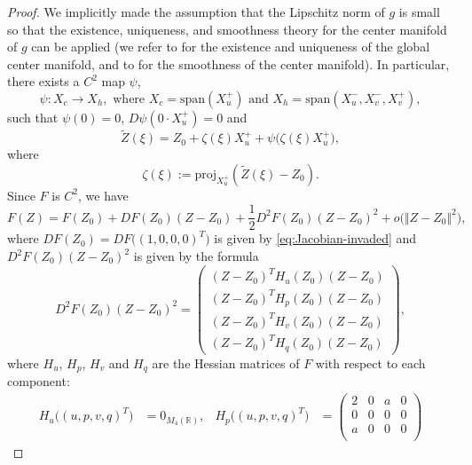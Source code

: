 \documentclass[11pt,a4paper]{article}
\numberwithin{equation}{section}
\numberwithin{figure}{section}
\begin{document}
\begin{proof}
    We implicitly made the assumption that the Lipschitz norm of $g$ is small so that the existence,  uniqueness, and smoothness theory for the center manifold of $g$ can be applied (we refer to \cite[Theorem 2.1]{Van-89} for the existence and uniqueness of the global center manifold, and to \cite[Theorem 3.1]{Van-89} for the smoothness of the center manifold). In particular, there exists a $C^2$ map $\psi$, 
    \begin{equation*}
        \psi:X_c\to X_h, \text{ where }  X_c = \text{span}(X_{u}^{+}) \text{ and }X_h = \text{span}(X_{u}^{-}, X_{v}^{-}, X_{v}^{+}),
    \end{equation*}
    such that $\psi(0)=0$, $D\psi(0\cdot X_{u}^{+}) = 0$ and 
    \begin{equation*}
        \tilde Z(\xi) =  Z_0 + \zeta(\xi) X_{u}^{+} + \psi\big(\zeta(\xi) X_{u}^{+}\big), 
    \end{equation*}
    where 
    \begin{equation*}
        \zeta(\xi):=\text{proj}_{X_{u}^{+}}(\tilde Z(\xi)-Z_0).
    \end{equation*}
    Since $F$ is $C^2$, we have 
    \begin{equation*}
        F(Z) = F(Z_0)+DF(Z_0)(Z-Z_0)+\frac{1}{2}D^2F(Z_0)(Z-Z_0)^2 + o\big(\Vert Z-Z_0\Vert^2\big), 
    \end{equation*}
    where $DF(Z_0)=DF\big((1, 0, 0, 0)^T\big) $ is given by \eqref{eq:Jacobian-invaded} and $D^2F(Z_0)(Z-Z_0)^2$ is given by the formula
    \begin{equation*}
        D^2F(Z_0)(Z-Z_0)^2 = \begin{pmatrix}
            (Z-Z_0)^T H_u(Z_0) (Z-Z_0) \\ 
            (Z-Z_0)^T H_p(Z_0) (Z-Z_0) \\ 
            (Z-Z_0)^T H_v(Z_0) (Z-Z_0) \\ 
            (Z-Z_0)^T H_q(Z_0) (Z-Z_0) 
        \end{pmatrix},
    \end{equation*}
    where $H_u$, $H_p$, $H_v$ and $H_q$ are the Hessian matrices of $F$ with respect to each component:
    \begin{align*}
        H_u\big((u, p, v, q)^T\big) &= 0_{M_4(\mathbb R)}, & H_p\big((u, p, v, q)^T\big) &= 
        \begin{pmatrix}
            2 & 0 & a & 0 \\
            0 & 0 & 0 & 0 \\
            a & 0 & 0 & 0 \\

\end{pmatrix}
\end{align*}
\end{proof}
\end{document}

